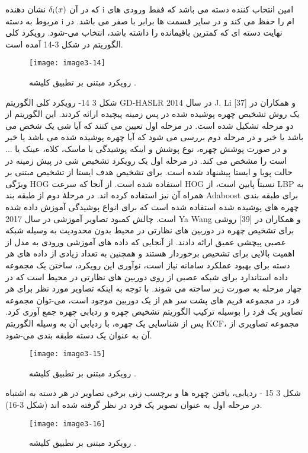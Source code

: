که در آن
$\delta \textsubscript{i}(x)$
نشان دهنده i امین انتخاب کننده دسته می باشد که فقط ورودی های مربوط به دسته i ام را حفظ می کند و در سایر قسمت ها برابر با صفر می باشد. در نهایت دسته ای که کمترین باقیمانده را داشته باشد، انتخاب می-شود. رویکرد کلی الگوریتم در شکل 3-14 آمده است.
 \begin{figure}[h]
\centering
  \texttt{[image: image3-14]}
  \caption{رویکرد مبتنی بر تطبیق کلیشه  \cite{ref1}.}
  \label{image2-1}
\end{figure}
شکل ‏3 14- رویکرد کلی الگوریتم GD-HASLR
در سال 2014 J. Li و همکاران در [37] یک روش تشخیص چهره پوشیده شده در پس زمینه پیچیده ارائه کردند. این الگوریتم از دو مرحله تشکیل شده است. در مرحله اول تعیین می کنند که آیا شی یک شخص می باشد یا خیر و در مرحله دوم بررسی می شود که آیا چهره پوشیده شده می باشد یا خیر و در صورت پوشش چهره، نوع پوشش و اینکه پوشیدگی با ماسک، کلاه، عینک یا ... است را مشخص می کند.
در مرحله اول یک رویکرد تشخیص شی در پیش زمینه در حالت پویا و ایستا پیشنهاد شده است. برای تشخیص هدف ایستا از تشخیص مبتنی بر ویژگی HOG استفاده شده است. از آنجا که سرعت HOG نسبتاً پایین است، از LBP به همراه آن نیز استفاده کرده اند. 
در مرحلۀ دوم از طبقه بند Adaboost برای طبقه بندی چهره های پوشیده شده استفاده شده است که برای انواع پوشیدگی آموزش داده شده است.
	چالش کمبود تصاویر آموزشی
در سال 2017 Ya Wang و همکاران در [39] روشی برای تشخیص چهره در دوربین های نظارتی در محیط بدون محدودیت به وسیله شبكه عصبی پیچشی عمیق ارائه دادند. از آنجایی که داده های آموزشی ورودی به مدل از اهمیت بالایی برای تشخیص برخوردار هستند و همچنین به تعداد زیادی از داده های هر دسته برای بهبود عملكرد سامانه نیاز است، نوآوری  این رویکرد، ساختن یک مجموعه داده استاندارد برای شبكه عصبی از روی دوربین های نظارتی در محیط است که در چهار مرحله به صورت زیر ساخته می شوند.
	 با توجه به اینكه تصاویر مورد نظر برای هر فرد در مجموعه فریم های پشت سر هم از یک دوربین موجود است، می-توان مجموعه تصاویر یک فرد را بوسیله ترکیب الگوریتم تشخیص چهره و ردیابی چهره جمع آوری کرد. پس از شناسایی یک چهره، با ردیابی آن به وسیله الگوریتم KCF، مجموعه تصاویری از آن به عنوان یک دسته طبقه بندی می-شود.
 \begin{figure}[h]
\centering
  \texttt{[image: image3-15]}
  \caption{رویکرد مبتنی بر تطبیق کلیشه  \cite{ref1}.}
  \label{image2-1}
\end{figure}
شکل ‏3 15 - ردیابی، یافتن چهره ها و برچسب زنی
	برخی تصاویر در هر دسته به اشتباه در مرحله اول به عنوان تصویر یک فرد در نظر گرفته شده اند (شکل 3-16).
 \begin{figure}[h]
\centering
  \texttt{[image: image3-16]}
  \caption{رویکرد مبتنی بر تطبیق کلیشه  \cite{ref1}.}
  \label{image2-1}
\end{figure}
